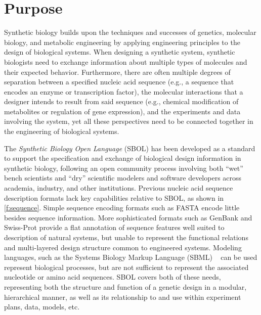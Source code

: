 \section{Purpose}

Synthetic biology builds upon the techniques and successes of genetics, molecular biology, and metabolic engineering by applying engineering principles to the design of biological systems. 
When designing a synthetic system, synthetic biologists need to exchange information about multiple types of molecules and their expected behavior.
Furthermore, there are often multiple degrees of separation between a specified nucleic acid sequence (e.g., a sequence that encodes an enzyme or transcription factor), the molecular interactions that a designer intends to result from said sequence (e.g., chemical modification of metabolites or regulation of gene expression), and the experiments and data involving the system, yet all these perspectives need to be connected together in the engineering of biological systems.

The \emph{Synthetic Biology Open Language} (SBOL) has been developed as a standard to support the specification and exchange of biological design information in synthetic biology, 
following an open community process involving both ``wet'' bench scientists and ``dry'' scientific modelers and software developers across academia, industry, and other institutions.
Previous nucleic acid sequence description formats lack key capabilities relative to SBOL, as shown in \ref{f:sequence}. 
Simple sequence encoding formats such as FASTA encode little besides sequence information. 
More sophisticated formats such as GenBank and Swiss-Prot provide a flat annotation of sequence features well suited to description of natural systems, but unable to represent the functional relations and multi-layered design structure common to engineered systems.
Modeling languages, such as the Systems Biology Markup Language (SBML) ~\cite{SBML} can be used represent biological processes, but are not sufficient to represent the associated nucleotide or amino acid sequences.  
SBOL covers both of these needs, representing both the structure and function of a genetic design in a modular, hierarchical manner, as well as its relationship to and use within experiment plans, data, models, etc.

